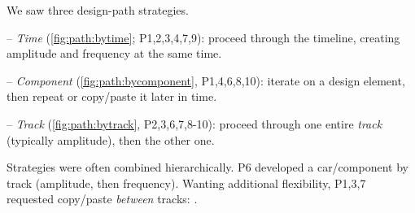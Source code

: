 %
%
%
%
    We saw three design-path strategies. %
    \par -- \emph{Time} (\autoref{fig:path:bytime};  P1,2,3,4,7,9): proceed through the timeline,  creating  amplitude  and  frequency  at  the  same  time.
    \par -- \emph{Component} (\autoref{fig:path:bycomponent}, P1,4,6,8,10): iterate  on  a  design element,  then  repeat  or  copy/paste it later in time.
    \par -- \emph{Track} (\autoref{fig:path:bytrack},  P2,3,6,7,8-10): proceed through one entire \emph{track} (typically amplitude), then the other one. 
    
 \noindent Strategies were often combined hierarchically. P6 developed a car/\lo component by track (amplitude, then frequency).
    Wanting additional flexibility,   %
    P1,3,7  requested  copy/paste  \emph{between}  tracks: .
 


